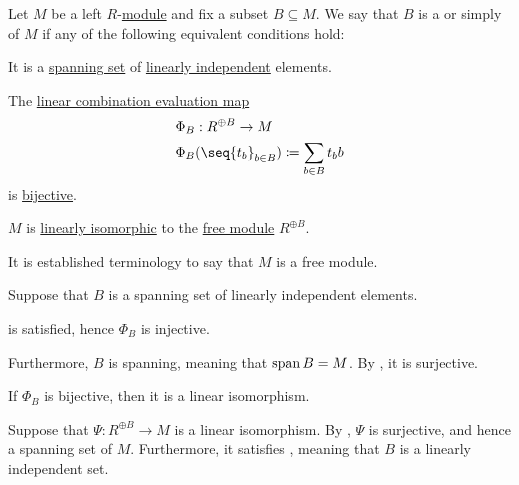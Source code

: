 \begin{definition}\label{def:hamel_basis}\mimprovised
  Let \( M \) be a left \( R \)-\hyperref[def:module]{module} and fix a subset \( B \subseteq M \). We say that \( B \) is a  or simply  of \( M \) if any of the following equivalent conditions hold:

  \begin{thmenum}
     It is a \hyperref[thm:span_via_linear_combinations]{spanning set} of \hyperref[def:linear_dependence]{linearly independent} elements.

     The \hyperref[thm:free_semimodule_universal_property]{linear combination evaluation map}
    \begin{equation*}
      \begin{aligned}
        &\Phi_B: R^{\oplus B} \to M \\
        &\Phi_B( \seq{ t_b }_{b \in B} ) \coloneqq \sum_{b \in B} t_b b
      \end{aligned}
    \end{equation*}
    is \hyperref[def:function_invertibility/bijective]{bijective}.

     \( M \) is \hyperref[def:semimodule/homomorphism]{linearly isomorphic} to the \hyperref[def:free_semimodule]{free module} \( R^{\oplus B} \).

    It is established terminology to say that \( M \) is a free module.
  \end{thmenum}
\end{definition}
\begin{defproof}
   Suppose that \( B \) is a spanning set of linearly independent elements.

   is satisfied, hence \( \Phi_B \) is injective.

  Furthermore, \( B \) is spanning, meaning that \( \operatorname{span} B = M \). By , it is surjective.

   If \( \Phi_B \) is bijective, then it is a linear isomorphism.

   Suppose that \( \Psi: R^{\oplus B} \to M \) is a linear isomorphism. By , \( \Psi \) is surjective, and hence a spanning set of \( M \). Furthermore, it satisfies , meaning that \( B \) is a linearly independent set.
\end{defproof}

